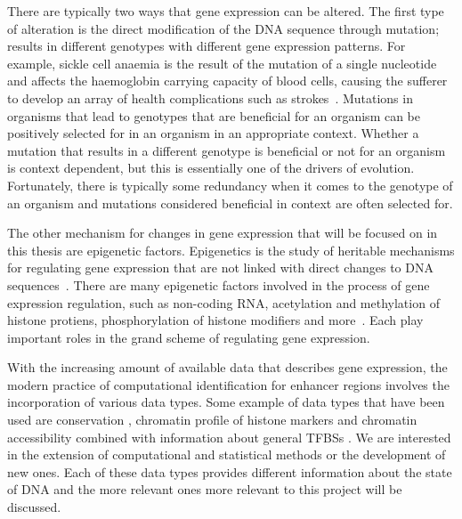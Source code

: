         There are typically two ways that gene expression can be altered.
        The first type of alteration is the direct modification of the DNA sequence through mutation; results in different genotypes with different gene expression patterns.
        For example, sickle cell anaemia is the result of the mutation of a single nucleotide and affects the haemoglobin carrying capacity of blood cells, causing the sufferer to develop an array of health complications such as strokes~\cite{clancy2008dna}. 
        Mutations in organisms that lead to genotypes that are beneficial for an organism can be positively selected for in an organism in an appropriate context. Whether a mutation that results in a different genotype is beneficial or not for an organism is context dependent, but this is essentially one of the drivers of evolution. Fortunately, there is typically some redundancy when it comes to the genotype of an organism and mutations considered beneficial in context are often selected for.
        
        The other mechanism for changes in gene expression that will be focused on in this thesis are epigenetic factors. Epigenetics is the study of heritable mechanisms for regulating gene expression that are not linked with direct changes to DNA sequences~\cite{holliday2006epigenetics}. There are many epigenetic factors involved in the process of gene expression regulation, such as non-coding RNA, acetylation and methylation of histone protiens, phosphorylation of histone modifiers and more~\cite{geiman2002chromatin, jaenisch2003epigenetic, holoch2015rna, waterland2003transposable}. Each play important roles in the grand scheme of regulating gene expression. 
        
        With the increasing amount of available data that describes gene expression, the modern practice of computational identification for enhancer regions involves the incorporation of various data types. Some example of data types that have been used are conservation \cite{visel2007enhancer}, chromatin profile of histone markers \cite{won2010genome} and chromatin accessibility combined with information about general TFBSs \cite{boyle2010high}. We are interested in the extension of computational and statistical methods or the development of new ones. Each of these data types provides different information about the state of DNA and the more relevant ones more relevant to this project will be discussed. 
        
